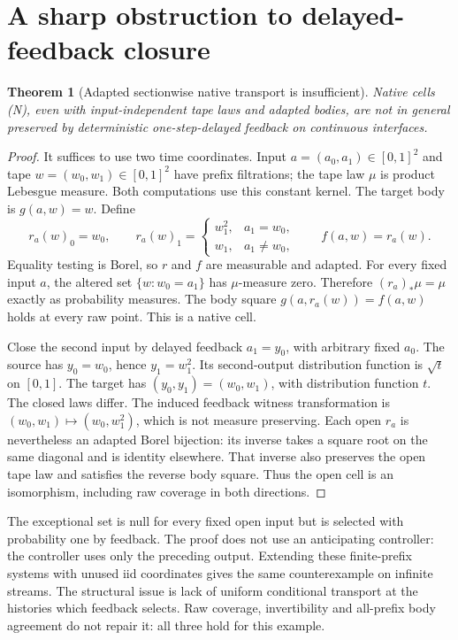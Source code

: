 \documentclass[11pt]{article}
\newtheorem{theorem}{Theorem}[section]
\begin{document}
\section{A sharp obstruction to delayed-feedback closure}
\begin{theorem}[Adapted sectionwise native transport is insufficient]\label{kernel:failure}
Native cells (N), even with input-independent tape laws and adapted bodies, are not in general preserved by deterministic one-step-delayed feedback on continuous interfaces.
\end{theorem}
\begin{proof}
It suffices to use two time coordinates. Input $a=(a_0,a_1)\in[0,1]^2$ and tape $w=(w_0,w_1)\in[0,1]^2$ have prefix filtrations; the tape law $\mu$ is product Lebesgue measure. Both computations use this constant kernel. The target body is $g(a,w)=w$. Define
\[
 r_a(w)_0=w_0,\qquad
 r_a(w)_1=\begin{cases}w_1^2,&a_1=w_0,\\w_1,&a_1\ne w_0,\end{cases}
 \qquad f(a,w)=r_a(w).
\]
Equality testing is Borel, so $r$ and $f$ are measurable and adapted. For every fixed input $a$, the altered set $\{w:w_0=a_1\}$ has $\mu$-measure zero. Therefore $(r_a)_*\mu=\mu$ exactly as probability measures. The body square $g(a,r_a(w))=f(a,w)$ holds at every raw point. This is a native cell.

Close the second input by delayed feedback $a_1=y_0$, with arbitrary fixed $a_0$. The source has $y_0=w_0$, hence $y_1=w_1^2$. Its second-output distribution function is $\sqrt{t}$ on $[0,1]$. The target has $(y_0,y_1)=(w_0,w_1)$, with distribution function $t$. The closed laws differ. The induced feedback witness transformation is $(w_0,w_1)\mapsto(w_0,w_1^2)$, which is not measure preserving. Each open $r_a$ is nevertheless an adapted Borel bijection: its inverse takes a square root on the same diagonal and is identity elsewhere. That inverse also preserves the open tape law and satisfies the reverse body square. Thus the open cell is an isomorphism, including raw coverage in both directions.
\end{proof}
The exceptional set is null for every fixed open input but is selected with probability one by feedback. The proof does not use an anticipating controller: the controller uses only the preceding output. Extending these finite-prefix systems with unused iid coordinates gives the same counterexample on infinite streams. The structural issue is lack of uniform conditional transport at the histories which feedback selects. Raw coverage, invertibility and all-prefix body agreement do not repair it: all three hold for this example.
\end{document}
